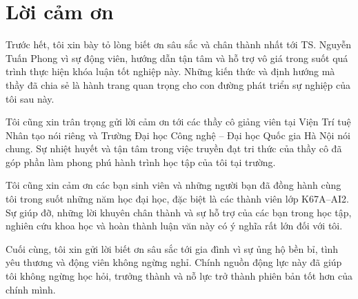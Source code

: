 \chapter*{Lời cảm ơn}


Trước hết, tôi xin bày tỏ lòng biết ơn sâu sắc và chân thành nhất tới TS. Nguyễn Tuấn Phong vì sự động viên, hướng dẫn tận tâm và hỗ trợ vô giá trong suốt quá trình thực hiện khóa luận tốt nghiệp này. Những kiến thức và định hướng mà thầy đã chia sẻ là hành trang quan trọng cho con đường phát triển sự nghiệp của tôi sau này.

Tôi cũng xin trân trọng gửi lời cảm ơn tới các thầy cô giảng viên tại Viện Trí tuệ Nhân tạo nói riêng và Trường Đại học Công nghệ – Đại học Quốc gia Hà Nội nói chung. Sự nhiệt huyết và tận tâm trong việc truyền đạt tri thức của thầy cô đã góp phần làm phong phú hành trình học tập của tôi tại trường.

Tôi cũng xin cảm ơn các bạn sinh viên và những người bạn đã đồng hành cùng tôi trong suốt những năm học đại học, đặc biệt là các thành viên lớp K67A–AI2. Sự giúp đỡ, những lời khuyên chân thành và sự hỗ trợ của các bạn trong học tập, nghiên cứu khoa học và hoàn thành luận văn này có ý nghĩa rất lớn đối với tôi.

Cuối cùng, tôi xin gửi lời biết ơn sâu sắc tới gia đình vì sự ủng hộ bền bỉ, tình yêu thương và động viên không ngừng nghỉ. Chính nguồn động lực này đã giúp tôi không ngừng học hỏi, trưởng thành và nỗ lực trở thành phiên bản tốt hơn của chính mình.

